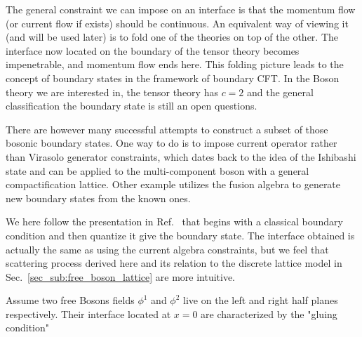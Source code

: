 
The general constraint we can impose on an interface is that the momentum flow (or current flow if exists) should be continuous. An equivalent way of viewing it (and will be used later) is to fold one of the theories on top of the other. The interface now located on the boundary of the tensor theory becomes impenetrable, and momentum flow ends here. This folding picture leads to the concept of boundary states in the framework of boundary CFT\cite{cardy_boundary_2004,cardy_conformal_1984}. In the Boson theory we are interested in, the tensor theory has $c = 2$ and the general classification the boundary state is still an open questions\cite{affleck_quantum_2001}. 

There are however many successful attempts to construct a subset of those bosonic boundary states. One way to do is to impose current operator rather than Virasolo generator constraints, which dates back to the idea of the Ishibashi state\cite{ishibashi_boundary_1989} and can be applied to the multi-component boson with a general compactification lattice\cite{affleck_quantum_2001,oshikawa_boundary_2010,quella_reflection_2007}. Other example utilizes the fusion algebra to generate new boundary states from the known ones\cite{affleck_quantum_2001,bachas_fusion_2008}. 

We here follow the presentation in Ref.~ that begins with a classical boundary condition and then quantize it give the boundary state. The interface obtained is actually the same as using the current algebra constraints\cite{affleck_quantum_2001,oshikawa_boundary_2010,quella_reflection_2007}, but we feel that scattering process derived here and its relation to the discrete lattice model in Sec.~\ref{sec_sub:free_boson_lattice} are more intuitive. 

Assume two free Bosons fields $\phi^1$ and $\phi^2$ live on the left and right half planes respectively. Their interface located at $x = 0$ are characterized by the "gluing condition"

